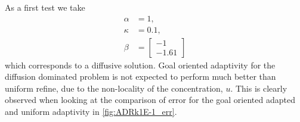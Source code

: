 \begin{test}[Diffusion Dominated ADR, $\kappa = 0.1$] \label{tst:ADRk1E-1}
    As a first test we take
    \begin{align*}
        \alpha &= 1, \\
        \kappa &= 0.1, \\
        \beta &= \begin{bmatrix} -1 \\ -1.61 \end{bmatrix}
    \end{align*}
    which corresponds to a diffusive solution. Goal oriented adaptivity for
    the diffusion dominated problem is not expected to perform much better than
    uniform refine, due to the non-locality of the concentration, $u$. This is
    clearly observed when looking at the comparison of error for the goal
    oriented adapted and uniform adaptivity in \autoref{fig:ADRk1E-1_err}.
    \begin{figure}[h]
        \centering
        \begin{minipage}[t]{0.49\textwidth}
            \centering
\end{minipage}
\end{figure}
\end{test}
